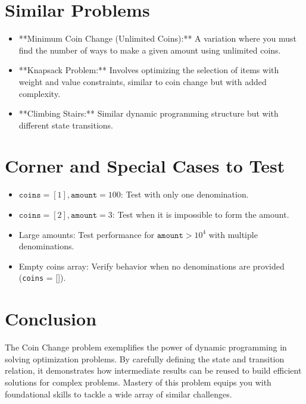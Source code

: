 \section*{Similar Problems}
\begin{itemize}
    \item **Minimum Coin Change (Unlimited Coins):** A variation where you must find the number of ways to make a given amount using unlimited coins.
    \item **Knapsack Problem:** Involves optimizing the selection of items with weight and value constraints, similar to coin change but with added complexity.
    \item **Climbing Stairs:** Similar dynamic programming structure but with different state transitions.
\end{itemize}

\section*{Corner and Special Cases to Test}
\begin{itemize}
    \item \( \texttt{coins} = [1], \texttt{amount} = 100 \): Test with only one denomination.
    \item \( \texttt{coins} = [2], \texttt{amount} = 3 \): Test when it is impossible to form the amount.
    \item Large amounts: Test performance for \( \texttt{amount} > 10^4 \) with multiple denominations.
    \item Empty coins array: Verify behavior when no denominations are provided (\texttt{coins} = []).
\end{itemize}

\section*{Conclusion}
The Coin Change problem exemplifies the power of dynamic programming in solving optimization problems. By carefully defining the state and transition relation, it demonstrates how intermediate results can be reused to build efficient solutions for complex problems. Mastery of this problem equips you with foundational skills to tackle a wide array of similar challenges.